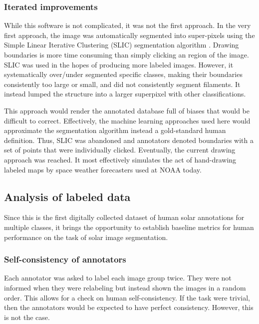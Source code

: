 \documentclass[twoside]{report}
\begin{document}
\subsubsection{Iterated improvements}
While this software is not complicated, it was not the first approach. In the very first approach, the image was automatically segmented into super-pixels using the Simple Linear Iterative Clustering (SLIC) segmentation algorithm \cite{SLIC}. Drawing boundaries is more time consuming than simply clicking an region of the image. SLIC was used in the hopes of producing more labeled images. However, it systematically over/under segmented specific classes, making their boundaries consistently too large or small, and did not consistently segment filaments. It instead lumped the structure into a larger superpixel with other classifications. 

This approach would render the annotated database full of biases that would be difficult to correct. Effectively, the machine learning approaches used here would approximate the segmentation algorithm instead a gold-standard human definition. Thus, SLIC was abandoned and annotators denoted boundaries with a set of points that were individually clicked. Eventually, the current drawing approach was reached. It most effectively simulates the act of hand-drawing labeled maps by space weather forecasters used at NOAA today. 

\subsection{Analysis of labeled data}
Since this is the first digitally collected dataset of human solar annotations for multiple classes, it brings the opportunity to establish baseline metrics for human performance on the task of solar image segmentation. 

\subsubsection{Self-consistency of annotators} \label{sec:consistency}

Each annotator was asked to label each image group twice. They were not informed when they were relabeling but instead shown the images in a random order. This allows for a check on human self-consistency. If the task were trivial, then the annotators would be expected to have perfect consistency. However, this is not the case. 
\end{document}
